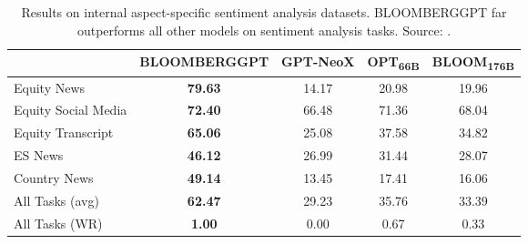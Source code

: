 \begin{table}[h!]
	\centering
	\begin{tabularx}{\textwidth}{Xcccc}
		\toprule
		                    & \textbf{BLOOMBERGGPT} & \textbf{GPT-NeoX} & \textbf{OPT\textsubscript{66B}} & \textbf{BLOOM\textsubscript{176B}} \\
		\midrule
		Equity News         & \textbf{79.63}        & 14.17             & 20.98                           & 19.96                              \\
		Equity Social Media & \textbf{72.40}        & 66.48             & 71.36                           & 68.04                              \\
		Equity Transcript   & \textbf{65.06}        & 25.08             & 37.58                           & 34.82                              \\
		ES News             & \textbf{46.12}        & 26.99             & 31.44                           & 28.07                              \\
		Country News        & \textbf{49.14}        & 13.45             & 17.41                           & 16.06                              \\
		\midrule
		All Tasks (avg)     & \textbf{62.47}        & 29.23             & 35.76                           & 33.39                              \\
		All Tasks (WR)      & \textbf{1.00}         & 0.00              & 0.67                            & 0.33                               \\
		\bottomrule
	\end{tabularx}
	\caption{Results on internal aspect-specific sentiment analysis datasets. BLOOMBERGGPT far outperforms all other models on sentiment analysis tasks. Source: \textcite{wu2023bloomberggpt}.}
	\label{tab:internal_aspect_sentiment}
\end{table}

